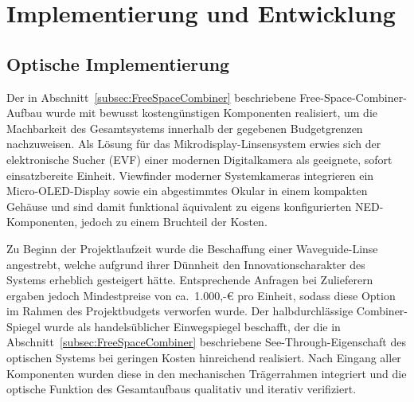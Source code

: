 
\chapter{Implementierung und Entwicklung}
\label{chap:implementierung}

\section{Optische Implementierung}
\label{sec:optischeImplementierung}

Der in Abschnitt~\ref{subsec:FreeSpaceCombiner} beschriebene Free-Space-Combiner-Aufbau
wurde mit bewusst kostengünstigen Komponenten realisiert, um die Machbarkeit des
Gesamtsystems innerhalb der gegebenen Budgetgrenzen nachzuweisen.
Als Lösung für das Mikrodisplay-Linsensystem erwies sich der elektronische
Sucher (\ac{EVF}) einer modernen Digitalkamera als geeignete, sofort einsatzbereite
Einheit.
Viewfinder moderner Systemkameras integrieren ein Micro-OLED-Display sowie ein
abgestimmtes Okular in einem kompakten Gehäuse und sind damit funktional äquivalent
zu eigens konfigurierten NED-Komponenten, jedoch zu einem Bruchteil der Kosten.

Zu Beginn der Projektlaufzeit wurde die Beschaffung einer Waveguide-Linse angestrebt,
welche aufgrund ihrer Dünnheit den Innovationscharakter des Systems erheblich
gesteigert hätte.
Entsprechende Anfragen bei Zulieferern ergaben jedoch Mindestpreise von
ca.\ 1.000,-€ pro Einheit, sodass diese Option im Rahmen des Projektbudgets
verworfen wurde.
Der halbdurchlässige Combiner-Spiegel wurde als handelsüblicher Einwegspiegel
beschafft, der die in Abschnitt~\ref{subsec:FreeSpaceCombiner} beschriebene
See-Through-Eigenschaft des optischen Systems bei geringen Kosten hinreichend
realisiert.
Nach Eingang aller Komponenten wurden diese in den mechanischen Trägerrahmen
integriert und die optische Funktion des Gesamtaufbaus qualitativ und iterativ
verifiziert.

